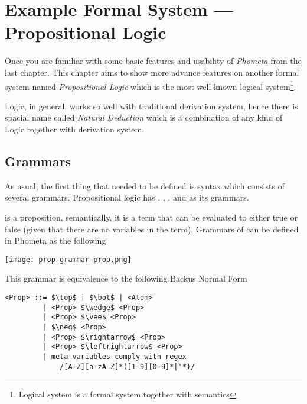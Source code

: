 \documentclass[master.tex]{subfiles}
\begin{document}
\chapter{Example Formal System --- Propositional Logic}
\label{chap:example_propositional_logic}

Once you are familiar with some basic features and usability of \emph{Phometa}
from the last chapter. This chapter aims to show more advance features on
another formal system named \emph{Propositional Logic} which is the most well
known logical system\footnote{Logical system is a formal system together with
  semantics\supercite{formal-system-wiki}}.

Logic, in general, works so well with traditional derivation system, hence there
is spacial name called \emph{Natural Deduction} which is a combination of any
kind of Logic together with derivation system.

\section{Grammars}

As usual, the first thing that needed to be defined is syntax which consists of
several grammars. Propositional logic has , ,
, and  as its grammars.

 is a proposition, semantically, it is a term that can be evaluated
to either true or false (given that there are no variables in the term).
Grammars of  can be defined in Phometa as the following

\centerline{\texttt{[image: prop-grammar-prop.png]}}

This grammar is equivalence to the following Backus Normal Form
\begin{lstlisting}[style=bnf]
<Prop> ::= $\top$ | $\bot$ | <Atom>
         | <Prop> $\wedge$ <Prop>
         | <Prop> $\vee$ <Prop>
         | $\neg$ <Prop>
         | <Prop> $\rightarrow$ <Prop>
         | <Prop> $\leftrightarrow$ <Prop>
         | meta-variables comply with regex
             /[A-Z][a-zA-Z]*([1-9][0-9]*|'*)/
\end{lstlisting}

\newcommand{\propTop}[0]{\bat{\pifmt{$\top$}}}
\newcommand{\propBot}[0]{\bat{\pifmt{$\bot$}}}
\newcommand{\propAnd}[0]{\pifmt{$\wedge$}}
\newcommand{\propOr}[0]{\pifmt{$\vee$}}
\newcommand{\propNot}[0]{\pifmt{$\neg$}}
\newcommand{\propImp}[0]{\pifmt{$\rightarrow$}}
\newcommand{\propIff}[0]{\pifmt{$\leftrightarrow$}}
\end{document}
